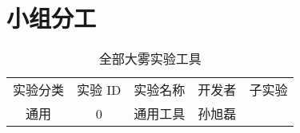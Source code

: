 \section{小组分工}

\begin{table*}[t]
  \centering
  \caption{全部大雾实验工具}
  \label{tab:func}
  \begin{tabular}{|c|c|c|c|c|}
    \hline
    实验分类 & 实验 ID & 实验名称 & 开发者 & 子实验 \\
    \hhline{|=|=|=|=|=|}
    通用 & 0 & 通用工具 & 孙旭磊 &\\
    \hline
  \end{tabular}
\end{table*}
